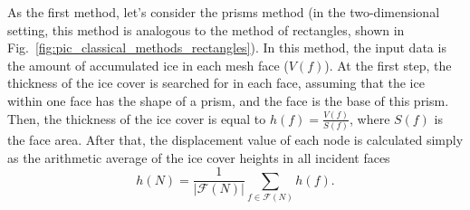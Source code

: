 \documentclass[
11pt,%
tightenlines,%
twoside,%
onecolumn,%
nofloats,%
nobibnotes,%
nofootinbib,%
superscriptaddress,%
noshowpacs,%
centertags]%
{revtex4-2}
\begin{document}
As the first method, let's consider the prisms method (in the two-dimensional setting, this method is analogous to the method of rectangles, shown in Fig.~\ref{fig:pic_classical_methods_rectangles}).
In this method, the input data is the amount of accumulated ice in each mesh face ($V(f)$).
At the first step, the thickness of the ice cover is searched for in each face, assuming that the ice within one face has the shape of a prism, and the face is the base of this prism.
Then, the thickness of the ice cover is equal to $h(f) =
\frac{V(f)}{S(f)}$, where $S(f)$ is the face area.
After that, the displacement value of each node is calculated simply
as the arithmetic average of the ice cover heights in all incident
faces
\begin{equation}
h(N) = \frac{1}{|\mathscr{F}(N)|} \sum_{f \in \mathscr{F}(N)}{h(f)}.
\end{equation}
\end{document}
